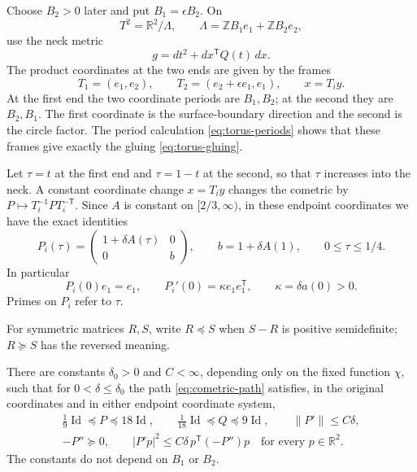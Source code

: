 Choose $B_2>0$ later and put $B_1=\epsilon B_2$.  On
\[
 T^2=\mathbb R^2/\Lambda,\qquad
 \Lambda=\mathbb Z B_1e_1+\mathbb Z B_2e_2,
\]
use the neck metric
\begin{equation}\label{eq:neck-metric}
 g=dt^2+dx^{\mathsf T}Q(t)\,dx.
\end{equation}
The product coordinates at the two ends are given by the frames
\begin{equation}\label{eq:end-frames}
 T_1=(e_1,e_2),\qquad T_2=(e_2+\epsilon e_1,e_1),\qquad x=T_i y.
\end{equation}
At the first end the two coordinate periods are $B_1,B_2$; at the second
they are $B_2,B_1$. The first coordinate is the surface-boundary direction
and the second is the circle factor. The period calculation
\eqref{eq:torus-periods} shows that these frames give exactly the gluing
\eqref{eq:torus-gluing}.

Let $\tau=t$ at the first end and $\tau=1-t$ at the second, so that
$\tau$ increases into the neck.  A constant coordinate change $x=T_i y$
changes the cometric by $P\mapsto T_i^{-1}PT_i^{-\mathsf T}$.
Since $A$ is constant on $[2/3,\infty)$, in these endpoint coordinates
we have the exact identities
\begin{equation}\label{eq:end-cometric}
 P_i(\tau)=\begin{pmatrix}1+\delta A(\tau)&0\\0&b\end{pmatrix},
 \qquad b=1+\delta A(1),\qquad 0\le\tau\le1/4.
\end{equation}
In particular
\begin{equation}\label{eq:end-cometric-slope}
 P_i(0)e_1=e_1,
 \qquad P_i'(0)=\kappa e_1e_1^{\mathsf T},
 \qquad \kappa=\delta a(0)>0.
\end{equation}
Primes on $P_i$ refer to $\tau$.

For symmetric matrices $R,S$, write $R\preceq S$ when $S-R$ is
positive semidefinite; $R\succeq S$ has the reversed meaning.

\begin{lemma}\label{lem:cometric-bounds}
There are constants $\delta_0>0$ and $C<\infty$, depending only on the
fixed function $\chi$, such that for $0<\delta\le\delta_0$ the path
\eqref{eq:cometric-path} satisfies, in the original coordinates and in
either endpoint coordinate system,
\begin{gather}
 \frac19\operatorname{Id}\preceq P\preceq18\operatorname{Id},
 \qquad
 \frac1{18}\operatorname{Id}\preceq Q\preceq9\operatorname{Id},
 \qquad \|P'\|\le C\delta,
 \label{eq:cometric-uniform}\\
 -P''\succeq0,
 \qquad |P'p|^2\le C\delta\,p^{\mathsf T}(-P'')p
 \quad\text{for every }p\in\mathbb R^2.
 \label{eq:cometric-domination}
\end{gather}
The constants do not depend on $B_1$ or $B_2$.
\end{lemma}

